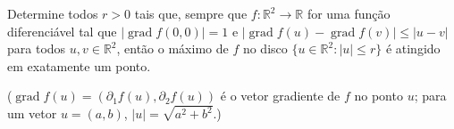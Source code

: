 Determine todos \(r > 0\) tais que, sempre que \(f \colon \mathbb{R}^2 \to \mathbb{R}\) for uma função diferenciável tal que \(|\operatorname{grad}f(0,0)| = 1\) e \(|\operatorname{grad}f(u) - \operatorname{grad} f(v)| \le |u - v|\) para todos \(u,v \in \mathbb{R}^2\), então o máximo de \(f\) no disco \(\{u \in \mathbb{R}^2 : |u| \le r\}\) é atingido em exatamente um ponto.

(\(\operatorname{grad} f(u) = (\partial_1 f(u), \partial_2 f(u))\) é o vetor gradiente de \(f\) no ponto \(u\); para um vetor \(u = (a,b)\), \(|u| = \sqrt{a^2 + b^2}\).)
